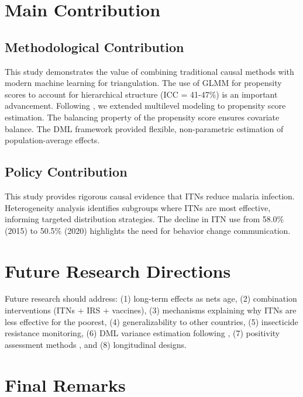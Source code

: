 \section{Main Contribution}

\subsection{Methodological Contribution}

This study demonstrates the value of combining traditional causal methods with modern machine learning for triangulation. The use of GLMM for propensity scores to account for hierarchical structure (ICC = 41-47\%) is an important advancement. Following \citet{ayele2024assessment}, we extended multilevel modeling to propensity score estimation. The balancing property of the propensity score \citep{rosenbaum1983central} ensures covariate balance. The DML framework \citep{chernozhukov2018double} provided flexible, non-parametric estimation of population-average effects.

\subsection{Policy Contribution}

This study provides rigorous causal evidence that ITNs reduce malaria infection. Heterogeneity analysis identifies subgroups where ITNs are most effective, informing targeted distribution strategies. The decline in ITN use from 58.0\% (2015) to 50.5\% (2020) highlights the need for behavior change communication.

\section{Future Research Directions}

Future research should address: (1) long-term effects as nets age, (2) combination interventions (ITNs + IRS + vaccines), (3) mechanisms explaining why ITNs are less effective for the poorest, (4) generalizability to other countries, (5) insecticide resistance monitoring, (6) DML variance estimation following \citet{wu2025why}, (7) positivity assessment methods \citep{westreich2010invited}, and (8) longitudinal designs.

\section{Final Remarks}

